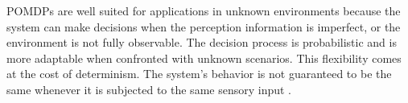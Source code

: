 POMDPs are well suited for applications in unknown environments because the system can make decisions when the perception information is imperfect, or the environment is not fully observable. The decision process is probabilistic and is more adaptable when confronted with unknown scenarios. This flexibility comes at the cost of determinism. The system's behavior is not guaranteed to be the same whenever it is subjected to the same sensory input \cite{krishnamurthy2016partially}.


